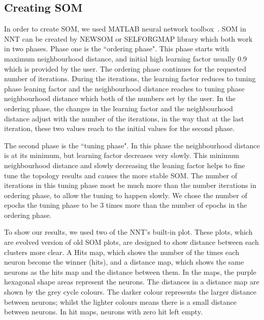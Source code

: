 \subsection{Creating SOM}
\label{sec: create_som}
     In order to create SOM, we used {\tiny MATLAB} neural network 
     toolbox~\citep[NNT,][]{matlabtolbox}.
     SOM in {\tiny NNT} can be created by {\tiny NEWSOM} or {\tiny SELFORGMAP} library which both work in two phases. 
     Phase one is the ``ordering phase". 
     This phase starts with maximum neighbourhood distance, and initial high learning factor usually 0.9 which is provided by the user. 
     The ordering phase continues for the requested number of iterations.
     During the iterations, the learning factor reduces to tuning phase leaning factor and the neighbourhood distance reaches to tuning phase neighbourhood distance which both of the numbers set by the user.
     In the ordering phase, the changes in the learning factor and the neighbourhood distance adjust with the number of the iterations, in the way that at the last iteration, these two values reach to the initial values for the second phase.
     
     The second phase is the ``tuning phase".
     In this phase the neighbourhood distance is at its minimum, but learning factor decreases very slowly.
     This minimum neighbourhood distance and slowly decreasing the leaning factor helps to fine tune the topology results and causes the more stable SOM. 
     The number of iterations in this tuning phase most be much more than the number iterations in ordering phase, to allow the tuning to happen slowly. %
     We chose the number of epochs the tuning phase to be 3 times more than the number of epochs in the ordering phase.
     
     To show our results, we used two of the {\tiny NNT}'s built-in plot.
     These plots, which are evolved version of old SOM plots, are designed to show distance between each clusters more clear.
     A Hits map, which shows the number of the times each neuron become the winner (hits), and a distance map, which shows the same neurons as the hits map and the distance between them.
     In the maps, the purple hexagonal shape areas represent the neurons.
     The distances in a distance map are shown by the grey cycle colours.
     The darker colour represents the larger distance between neurons; whilst the lighter colours means there is a small distance between neurons.
     In hit maps, neurons with zero hit left empty.
      
